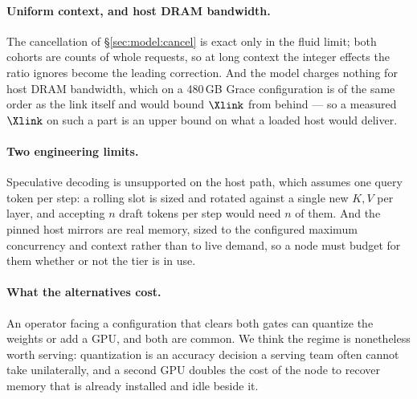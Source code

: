 \paragraph{Uniform context, and host DRAM bandwidth.} The cancellation of
\S\ref{sec:model:cancel} is exact only in the fluid limit; both cohorts are counts
of whole requests, so at long context the integer effects the ratio ignores become
the leading correction. And the model charges nothing for host DRAM bandwidth, which
on a 480\,GB Grace configuration is of the same order as the link itself and would
bound $\Xlink$ from behind --- so a measured $\Xlink$ on such a part is an upper
bound on what a loaded host would deliver.

\paragraph{Two engineering limits.} Speculative decoding is unsupported on the host
path, which assumes one query token per step: a rolling slot is sized and rotated
against a single new $K,V$ per layer, and accepting $n$ draft tokens per step would
need $n$ of them. And the pinned host mirrors are real memory, sized to the configured
maximum concurrency and context rather than to live demand, so a node must budget for
them whether or not the tier is in use.

\paragraph{What the alternatives cost.} An operator facing a configuration that
clears both gates can quantize the weights or add a GPU, and both are common. We
think the regime is nonetheless worth serving: quantization is an accuracy decision
a serving team often cannot take unilaterally, and a second GPU doubles the cost of
the node to recover memory that is already installed and idle beside it.
